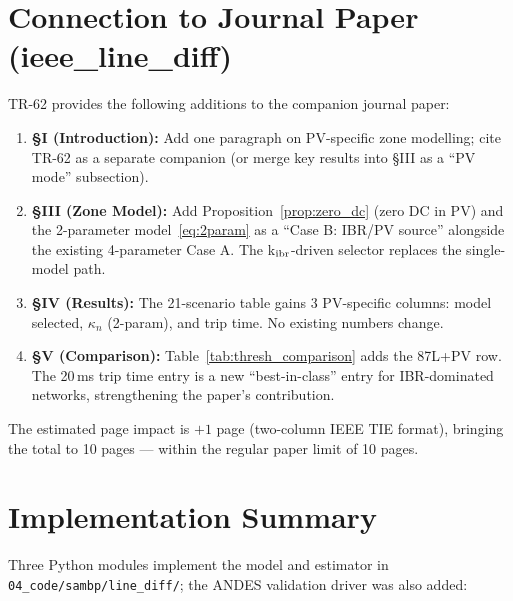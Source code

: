 \documentclass[11pt, a4paper]{article}
\newcommand{\kn}{\kappa_n}
\begin{document}
\section{Connection to Journal Paper (ieee\_line\_diff)}
\label{sec:journal_update}

TR-62 provides the following additions to the companion journal paper:

\begin{enumerate}
  \item \textbf{§I (Introduction):}  Add one paragraph on PV-specific zone
    modelling; cite TR-62 as a separate companion (or merge key results
    into §III as a ``PV mode'' subsection).

  \item \textbf{§III (Zone Model):}  Add Proposition~\ref{prop:zero_dc}
    (zero DC in PV) and the 2-parameter model~\eqref{eq:2param} as a
    ``Case B: IBR/PV source'' alongside the existing 4-parameter Case A.
    The k$_{\rm ibr}$-driven selector replaces the single-model path.

  \item \textbf{§IV (Results):}  The 21-scenario table gains 3 PV-specific
    columns: model selected, $\kn$ (2-param), and trip time.  No existing
    numbers change.

  \item \textbf{§V (Comparison):}  Table~\ref{tab:thresh_comparison} adds
    the 87L+PV row.  The 20\,ms trip time entry is a new ``best-in-class''
    entry for IBR-dominated networks, strengthening the paper's contribution.
\end{enumerate}

The estimated page impact is $+1$ page (two-column IEEE TIE format), bringing
the total to 10 pages — within the regular paper limit of 10 pages.

\section{Implementation Summary}
\label{sec:implementation}

Three Python modules implement the model and estimator in
\texttt{04\_code/sambp/line\_diff/}; the ANDES validation driver was also added:
\end{document}
